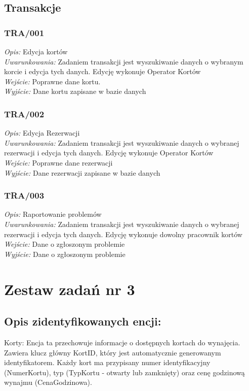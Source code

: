 \documentclass{article}
\begin{document}
\subsection*{Transakcje}
\subsubsection*{TRA/001}
\textit{Opis:} Edycja kortów\\
\textit{Uwarunkowania:} Zadaniem transakcji jest wyszukiwanie danych o wybranym korcie i edycja tych danych. Edycję wykonuje Operator Kortów\\
\textit{Wejście:} Poprawne dane kortu.\\
\textit{Wyjście:} Dane kortu zapisane w bazie danych\\

\subsubsection*{TRA/002}
\textit{Opis:} Edycja Rezerwacji\\
\textit{Uwarunkowania:} Zadaniem transakcji jest wyszukiwanie danych o wybranej rezerwacji i edycja tych danych. Edycję wykonuje Operator Kortów\\
\textit{Wejście:} Poprawne dane rezerwacji\\
\textit{Wyjście:} Dane rezerwacji zapisane w bazie danych\\

\subsubsection*{TRA/003}
\textit{Opis:} Raportowanie problemów\\
\textit{Uwarunkowania:} Zadaniem transakcji jest wyszukiwanie danych o wybranej rezerwacji i edycja tych danych. Edycję wykonuje dowolny pracownik kortów\\
\textit{Wejście:} Dane o zgłoszonym problemie\\
\textit{Wyjście:} Dane o zgłoszonym problemie\\

\section*{Zestaw zadań nr 3}
\subsection*{Opis zidentyfikowanych encji:}
Korty: Encja ta przechowuje informacje o dostępnych kortach do wynajęcia. Zawiera klucz główny KortID, który jest automatycznie generowanym identyfikatorem. Każdy kort ma przypisany numer identyfikacyjny (NumerKortu), typ (TypKortu - otwarty lub zamknięty) oraz cenę godzinową wynajmu (CenaGodzinowa).\\
\end{document}
